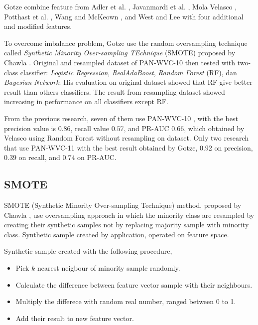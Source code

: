 \documentclass[conference,compsoc,a4paper,twocolumn,final]{IEEEtran}
\begin{document}
Gotze \cite{gotze2014advanced} combine feature from
Adler et al. \cite{adler2011wikipedia},
Javanmardi et al. \cite{javanmardi2011vandalism},
Mola Velasco \cite{mola2012wikipedia},
Potthast et al. \cite{potthast2008automatic},
Wang and McKeown \cite{wang2010got}, and
West and Lee \cite{west2011multilingual}
with four additional and modified features.

To overcome imbalance problem, Gotze use the random oversampling technique
called
\textit{Synthetic Minority Over-sampling TEchnique} (SMOTE)
proposed by Chawla
\cite{chawla2002smote}.
Original and resampled dataset of PAN-WVC-10 then tested with two-class
classifier:
\textit{Logistic Regression},
\textit{RealAdaBoost},
\textit{Random Forest} (RF), dan
\textit{Bayesian Network}.
His evaluation on original dataset showed that RF give better result than
others classifiers.
The result from resampling dataset showed increasing in performance on all
classifiers except RF.

From the previous research, seven of them use PAN-WVC-10
\cite{adler2010detecting}
\cite{adler2011wikipedia}
\cite{gotze2014advanced}
\cite{harpalani2011language}
\cite{mola2012wikipedia}
\cite{wang2010got}
\cite{west2011multilingual},
with the best precision value is $0.86$, recall value $0.57$, and PR-AUC
$0.66$, which obtained by Velasco using Random Forest without resampling on
dataset.
Only two research that use PAN-WVC-11
\cite{gotze2014advanced}
\cite{west2011multilingual}
with the best result obtained by Gotze, $0.92$ on precision, $0.39$
on recall, and $0.74$ on PR-AUC.

\subsection{SMOTE}
\label{subsection:smote}

SMOTE (Synthetic Minority Over-sampling Technique) method, proposed by Chawla
\cite{chawla2002smote},
use oversampling approach in which the minority class are resampled by creating
their synthetic samples not by replacing majority sample with minority class.
Synthetic sample created by application, operated on feature space.

Synthetic sample created with the following procedure,
\begin{itemize}
\item Pick $k$ nearest neigbour of minority sample randomly.
\item Calculate the difference between feature vector sample with their
neighbours.
\item Multiply the differece with random real number, ranged between 0 to 1.
\item Add their result to new feature vector.
\end{itemize}
\end{document}
